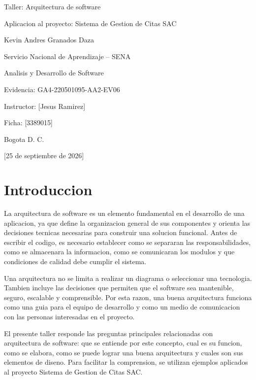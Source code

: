 \documentclass[12pt,letterpaper]{article}
\newcommand{\institucion}{Servicio Nacional de Aprendizaje -- SENA}
\newcommand{\programa}{Analisis y Desarrollo de Software}
\newcommand{\tituloTrabajo}{Taller: Arquitectura de software}
\newcommand{\codigoEvidencia}{GA4-220501095-AA2-EV06}
\newcommand{\nombreProyecto}{Sistema de Gestion de Citas SAC}
\newcommand{\aprendiz}{Kevin Andres Granados Daza}
\newcommand{\instructor}{[Jesus Ramirez]}
\newcommand{\ficha}{[3389015]}
\newcommand{\ciudad}{Bogota D. C.}
\newcommand{\fechaEntrega}{[25 de septiembre de 2026]}
\begin{document}
\begin{titlepage}
    \centering
    \vspace*{2.5cm}
    {\Large \tituloTrabajo\par}
    \vspace{0.8cm}
    {\large Aplicacion al proyecto: \nombreProyecto\par}
    \vfill
    {\large \aprendiz\par}
    \vspace{1.5cm}
    {\large \institucion\par}
    {\large \programa\par}
    \vspace{1cm}
    {\large Evidencia: \codigoEvidencia\par}
    \vspace{1cm}
    {\large Instructor: \instructor\par}
    {\large Ficha: \ficha\par}
    \vfill
    {\large \ciudad\par}
    {\large \fechaEntrega\par}
\end{titlepage}

\section{Introduccion}

La arquitectura de software es un elemento fundamental en el desarrollo de una aplicacion, ya que define la organizacion general de sus componentes y orienta las decisiones tecnicas necesarias para construir una solucion funcional. Antes de escribir el codigo, es necesario establecer como se separaran las responsabilidades, como se almacenara la informacion, como se comunicaran los modulos y que condiciones de calidad debe cumplir el sistema.

Una arquitectura no se limita a realizar un diagrama o seleccionar una tecnologia. Tambien incluye las decisiones que permiten que el software sea mantenible, seguro, escalable y comprensible. Por esta razon, una buena arquitectura funciona como una guia para el equipo de desarrollo y como un medio de comunicacion con las personas interesadas en el proyecto.

El presente taller responde las preguntas principales relacionadas con arquitectura de software: que se entiende por este concepto, cual es su funcion, como se elabora, como se puede lograr una buena arquitectura y cuales son sus elementos de diseno. Para facilitar la comprension, se utilizan ejemplos aplicados al proyecto \nombreProyecto.
\end{document}

